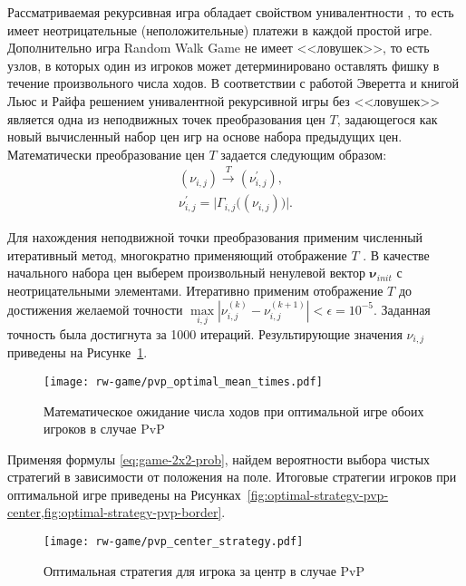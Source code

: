 Рассматриваемая рекурсивная игра обладает свойством унивалентности \cite{everett_recursive_1958}, то есть имеет неотрицательные (неположительные) платежи в каждой простой игре. Дополнительно игра Random Walk Game не имеет <<ловушек>>, то есть узлов, в которых один из игроков может детерминировано оставлять фишку в течение произвольного числа ходов. В соответствии с работой Эверетта \cite{everett_recursive_1958} и книгой Льюс и Райфа \cite{luce_games_1957a} решением унивалентной рекурсивной игры без <<ловушек>> является одна из неподвижных точек преобразования цен $T$, задающегося как новый вычисленный набор цен игр на основе набора предыдущих цен. Математически преобразование цен $T$ задается следующим образом:
\begin{equation}
    \begin{aligned}
        (\nu_{i,j}) \xrightarrow{T} (\nu_{i,j}^\prime), \\
        \nu_{i,j}^\prime = \big |\Gamma_{i,j} \big(\left (\nu_{i,j} \right ) \big)\big |.
    \end{aligned}
\end{equation}

Для нахождения неподвижной точки преобразования применим численный итеративный метод, многократно применяющий отображение $T$ \cite{everett_recursive_1958}. В качестве начального набора цен выберем произвольный ненулевой вектор $\boldsymbol{\nu}_{init}$ с неотрицательными элементами. 
Итеративно применим отображение $T$ до достижения желаемой точности $\max\limits_{i,j}\left |\nu_{i,j}^{(k)}-\nu_{i,j}^{(k+1)}\right |<\epsilon=10^{-5}$. Заданная точность была достигнута за 1000 итераций. Результирующие значения $\nu_{i,j}$ приведены на Рисунке~\cref{fig:optimal-value-pvp}.

\begin{figure}[t]
    \centering
    \texttt{[image: rw-game/pvp\_optimal\_mean\_times.pdf]}
    \caption{
        Математическое ожидание числа ходов при оптимальной игре обоих игроков в случае PvP
    }  
    \label{fig:optimal-value-pvp}
\end{figure}

Применяя формулы \cref{eq:game-2x2-prob}, найдем вероятности выбора чистых стратегий в зависимости от положения на поле. Итоговые стратегии игроков при оптимальной игре приведены на Рисунках~\cref{fig:optimal-strategy-pvp-center,fig:optimal-strategy-pvp-border}. 

\begin{figure}[t]
    \centering
    \texttt{[image: rw-game/pvp\_center\_strategy.pdf]}
    \caption{
        Оптимальная стратегия для игрока за центр в случае PvP
    }  
    \label{fig:optimal-strategy-pvp-center}
    
\end{figure}

